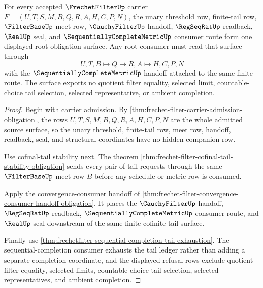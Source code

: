 \begin{theorem}
\label{thm:frechetfilter-root-obligation-triad}
For every accepted $\FrechetFilterUp$ carrier $F=(U,T,S,M,B,Q,R,A,H,C,P,N)$, the unary threshold row, finite-tail row, $\FilterBaseUp$ meet row, $\CauchyFilterUp$ handoff, $\RegSeqRatUp$ readback, $\RealUp$ seal, and $\SequentiallyCompleteMetricUp$ consumer route form one displayed root obligation surface. Any root consumer must read that surface through
$$
U,T,B \longmapsto Q \longmapsto R,A \longmapsto H,C,P,N
$$
with the $\SequentiallyCompleteMetricUp$ handoff attached to the same finite route. The surface exports no quotient filter equality, selected limit, countable-choice tail selection, selected representative, or ambient completion.
\end{theorem}
\begin{proof}
Begin with carrier admission. By \autoref{thm:frechet-filter-carrier-admission-obligation}, the rows $U,T,S,M,B,Q,R,A,H,C,P,N$ are the whole admitted source surface, so the unary threshold, finite-tail row, meet row, handoff, readback, seal, and structural coordinates have no hidden companion row.

Use cofinal-tail stability next. The theorem \autoref{thm:frechet-filter-cofinal-tail-stability-obligation} sends every pair of tail requests through the same $\FilterBaseUp$ meet row $B$ before any schedule or metric row is consumed.

Apply the convergence-consumer handoff of \autoref{thm:frechet-filter-convergence-consumer-handoff-obligation}. It places the $\CauchyFilterUp$ handoff, $\RegSeqRatUp$ readback, $\SequentiallyCompleteMetricUp$ consumer route, and $\RealUp$ seal downstream of the same finite cofinite-tail surface.

Finally use \autoref{thm:frechetfilter-sequential-completion-tail-exhaustion}. The sequential-completion consumer exhausts the tail ledger rather than adding a separate completion coordinate, and the displayed refusal rows exclude quotient filter equality, selected limits, countable-choice tail selection, selected representatives, and ambient completion.
\end{proof}


